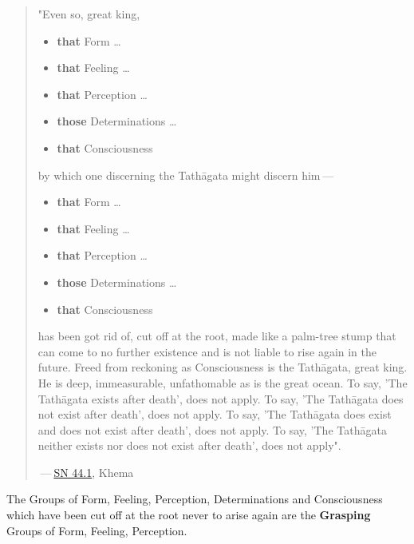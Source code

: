 \begin{quotation}
"Even so, great king,


\begin{itemize}

\item \textbf{that} Form …​

\item \textbf{that} Feeling …​

\item \textbf{that} Perception …​

\item \textbf{those} Determinations …​

\item \textbf{that} Consciousness

\end{itemize}


by which one discerning the Tathāgata might discern him — 


\begin{itemize}

\item \textbf{that} Form …​

\item \textbf{that} Feeling …​

\item \textbf{that} Perception …​

\item \textbf{those} Determinations …​

\item \textbf{that} Consciousness

\end{itemize}


has been got rid of, cut off at the root, made like a
palm-tree stump that can come to no further existence and is not liable
to rise again in the future. Freed from reckoning as Consciousness is
the Tathāgata, great king. He is deep, immeasurable, unfathomable as is
the great ocean. To say, 'The Tathāgata exists after death', does not
apply. To say, 'The Tathāgata does not exist after death', does not
apply. To say, 'The Tathāgata does exist and does not exist after
death', does not apply. To say, 'The Tathāgata neither exists nor does
not exist after death', does not apply".


 — \href{https://suttacentral.net/sn44.1/en/bodhi}{SN 44.1}, Khema


\end{quotation}

The Groups of Form, Feeling, Perception, Determinations and
Consciousness which have been cut off at the root never to arise again
are the \textbf{Grasping} Groups of Form, Feeling, Perception.



